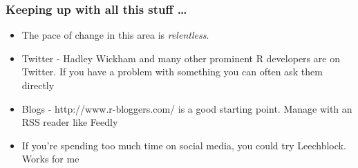 \documentclass{beamer}
\begin{document}
\begin{frame}
\frametitle{Keeping up with all this stuff \ldots}
\begin{itemize}
\item The pace of change in this area is \emph{relentless}.
\item Twitter - Hadley Wickham and many other prominent R developers are on Twitter. If you 
			have a problem with something you can often ask them directly
\item Blogs - http://www.r-bloggers.com/ is a good starting point. Manage with an RSS reader 				like Feedly
\item If you're spending too much time on social media, you could try Leechblock.
			Works for me
\end{itemize}
\end{frame}
\end{document}
